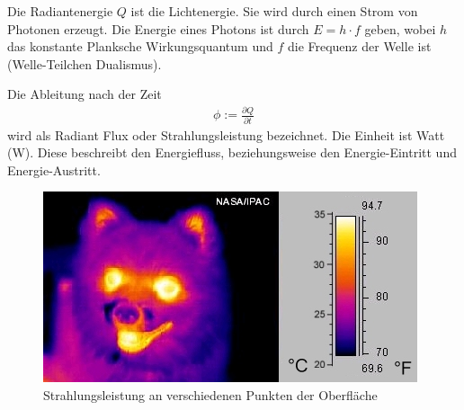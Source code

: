 Die Radiantenergie $Q$ ist die Lichtenergie. Sie wird durch einen Strom von Photonen erzeugt. Die Energie eines Photons ist 
durch $E=h \cdot f$ geben, wobei $h$ das konstante Planksche Wirkungsquantum und $f$ die Frequenz der Welle ist (Welle-Teilchen Dualismus).  

\begin{Definition}
Die Ableitung nach der Zeit
\begin{align}
\phi := \frac{\partial Q}{\partial t}
\end{align}
wird als Radiant Flux oder Strahlungsleistung bezeichnet. Die Einheit ist Watt (W).
Diese  beschreibt den Energiefluss, beziehungsweise den Energie-Eintritt und Energie-Austritt.
\end{Definition}

 \begin{figure}[H]
    \centering
    \includegraphics[height=0.5\textwidth]{images/infrared_dog.jpg}
    \caption{Strahlungsleistung an verschiedenen Punkten der Oberfläche}
    \label{fig:cray}
\end{figure}


